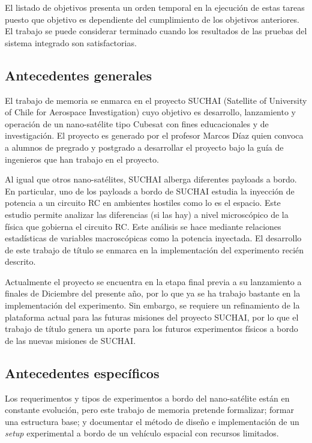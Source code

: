 \documentclass[11pt,letterpaper]{article}
\begin{document}
El listado de objetivos presenta un orden temporal en la ejecución de estas tareas puesto que objetivo es dependiente del cumplimiento de los objetivos anteriores. El trabajo se puede considerar terminado cuando los resultados de las pruebas del sistema integrado son satisfactorias.

\subsection{Antecedentes generales}

El trabajo de memoria se enmarca en el proyecto SUCHAI (Satellite of University of Chile for Aerospace Investigation) cuyo objetivo es desarrollo, lanzamiento y operación de un nano-satélite tipo Cubesat con fines educacionales y de investigación. El proyecto es generado por el profesor Marcos Díaz quien convoca a alumnos de pregrado y postgrado a desarrollar el proyecto bajo la guía de ingenieros que han trabajo en el proyecto.

Al igual que otros nano-sat\'elites, SUCHAI alberga diferentes payloads a bordo. En particular, uno de los payloads a bordo de SUCHAI estudia la inyección de potencia a un circuito RC en ambientes hostiles como lo es el espacio. Este estudio permite analizar las diferencias (si las hay) a nivel microscópico de la física que gobierna el circuito RC. Este análisis se hace mediante relaciones estadísticas de variables macroscópicas como la potencia inyectada. El desarrollo de este trabajo de título se enmarca en la implementación del experimento reci\'en descrito.

Actualmente el proyecto se encuentra en la etapa final previa a su lanzamiento a finales de Diciembre del presente año, por lo que ya se ha trabajo bastante en la implementación del experimento. Sin embargo, se requiere un refinamiento de la plataforma actual para las futuras misiones del proyecto SUCHAI, por lo que el trabajo de título genera un aporte para los futuros experimentos físicos a bordo de las nuevas misiones de SUCHAI.

\subsection{Antecedentes específicos}

Los requerimentos y tipos de experimentos a bordo del nano-sat\'elite están en constante evolución, pero este trabajo de memoria pretende formalizar; formar una estructura base; y documentar el m\'etodo de diseño e implementación de un \textit{setup} experimental a bordo de un vehículo espacial con recursos limitados.
\end{document}
